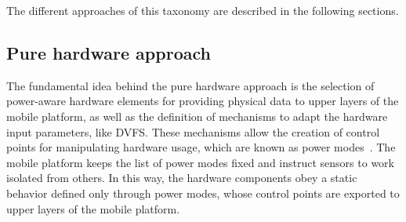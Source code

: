 \documentclass[ENG,PhD]{cinvestav}
\begin{document}
The different approaches of this taxonomy are described in the following sections.



\subsection{Pure hardware approach}
The fundamental idea behind the pure hardware approach is the selection of power-aware hardware elements for providing physical data to upper layers of the mobile platform, as well as the definition of mechanisms to adapt the hardware input parameters, like DVFS.
These mechanisms allow the creation of control points for manipulating hardware usage, which are known as power modes~\cite{Ranganathan2010,Lorch1998,Benini2000}.
The mobile platform keeps the list of power modes fixed and instruct sensors to work isolated from others.
In this way, the hardware components obey a static behavior defined only through power modes, whose control points are exported to upper layers of the mobile platform.
\end{document}
